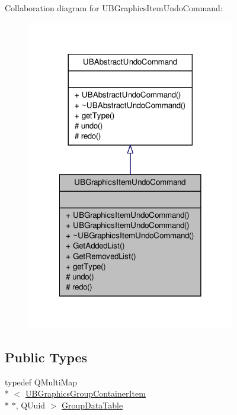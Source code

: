 Collaboration diagram for U\-B\-Graphics\-Item\-Undo\-Command\-:
\nopagebreak
\begin{figure}[H]
\begin{center}
\leavevmode
\includegraphics[width=258pt]{db/d48/class_u_b_graphics_item_undo_command__coll__graph}
\end{center}
\end{figure}
\subsection*{Public Types}
\begin{DoxyCompactItemize}
\item 
typedef Q\-Multi\-Map\\*
$<$ \hyperlink{class_u_b_graphics_group_container_item}{U\-B\-Graphics\-Group\-Container\-Item} \\*
$\ast$, Q\-Uuid $>$ \hyperlink{class_u_b_graphics_item_undo_command_a4aa053457a498a33bbfef270fbf4608a}{Group\-Data\-Table}
\end{DoxyCompactItemize}

